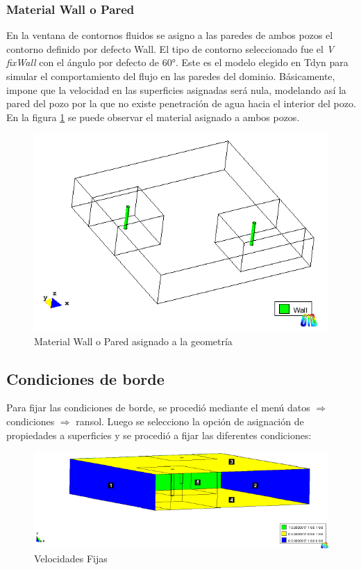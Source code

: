 \documentclass[10pt,a4paper,final]{article}
\begin{document}
\subsubsection{Material Wall o Pared}
En la ventana de contornos fluidos se asigno a las paredes de ambos pozos el contorno definido por defecto Wall. El tipo de contorno seleccionado fue el \emph{V fixWall} con el ángulo por defecto de $60°$. Este es el modelo elegido en Tdyn para simular el comportamiento del flujo en las paredes del dominio. Básicamente, impone que la velocidad en las superficies asignadas será nula, modelando así la pared del pozo por la que no existe penetración de agua hacia el interior del pozo. En la figura \ref{datos_contornos_fluidos_vista} se puede observar el material asignado a ambos pozos.
\begin{figure}[tbhp]
\centerline{\includegraphics[scale=0.75]{img/datos_contornos_fluidos_vista}}
\caption{Material Wall o Pared asignado a la geometría}
\label{datos_contornos_fluidos_vista}
\end{figure}
\subsection{Condiciones de borde}
Para fijar las condiciones de borde, se procedió mediante el menú datos $\Rightarrow$ condiciones $\Rightarrow$ ransol. Luego se selecciono la opción de asignación de propiedades a superficies y se procedió a fijar las diferentes condiciones:
\begin{figure}[tbhp]
\centerline{\includegraphics[scale=0.75]{img/datos_condiciones_ransol_fijar_velocidadinterno_leyendas}}
\caption{Velocidades Fijas}
\label{datos_condiciones_ransol_fijar_velocidadinterno_leyendas}
\end{figure}
\end{document}
